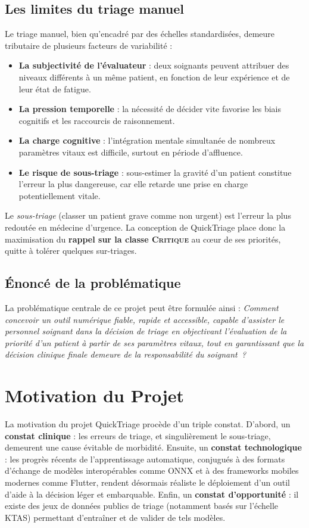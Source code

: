\subsection{Les limites du triage manuel}
Le triage manuel, bien qu'encadré par des échelles standardisées, demeure tributaire de
plusieurs facteurs de variabilité :
\begin{itemize}
  \item \textbf{La subjectivité de l'évaluateur} : deux soignants peuvent attribuer des
  niveaux différents à un même patient, en fonction de leur expérience et de leur état de
  fatigue.
  \item \textbf{La pression temporelle} : la nécessité de décider vite favorise les biais
  cognitifs et les raccourcis de raisonnement.
  \item \textbf{La charge cognitive} : l'intégration mentale simultanée de nombreux
  paramètres vitaux est difficile, surtout en période d'affluence.
  \item \textbf{Le risque de sous-triage} : sous-estimer la gravité d'un patient constitue
  l'erreur la plus dangereuse, car elle retarde une prise en charge potentiellement vitale.
\end{itemize}

\begin{warningbox}
Le \textit{sous-triage} (classer un patient grave comme non urgent) est l'erreur la plus
redoutée en médecine d'urgence. La conception de QuickTriage place donc la maximisation du
\textbf{rappel sur la classe \textsc{Critique}} au cœur de ses priorités, quitte à tolérer
quelques sur-triages.
\end{warningbox}

\subsection{Énoncé de la problématique}
La problématique centrale de ce projet peut être formulée ainsi : \textit{Comment concevoir
un outil numérique fiable, rapide et accessible, capable d'assister le personnel soignant
dans la décision de triage en objectivant l'évaluation de la priorité d'un patient à partir
de ses paramètres vitaux, tout en garantissant que la décision clinique finale demeure de la
responsabilité du soignant~?}

\section{Motivation du Projet}
La motivation du projet QuickTriage procède d'un triple constat. D'abord, un
\textbf{constat clinique} : les erreurs de triage, et singulièrement le sous-triage,
demeurent une cause évitable de morbidité. Ensuite, un \textbf{constat technologique} :
les progrès récents de l'apprentissage automatique, conjugués à des formats d'échange de
modèles interopérables comme ONNX et à des frameworks mobiles modernes comme Flutter,
rendent désormais réaliste le déploiement d'un outil d'aide à la décision léger et
embarquable. Enfin, un \textbf{constat d'opportunité} : il existe des jeux de données
publics de triage (notamment basés sur l'échelle KTAS) permettant d'entraîner et de valider
de tels modèles.

